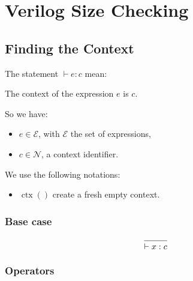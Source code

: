 \documentclass{article}
\DeclareMathOperator{\ctx}{ctx}
\begin{document}
\section*{Verilog Size Checking}

\subsection*{Finding the Context}

The statement $\vdash e: c$ mean:
\begin{center}
  The context of the expression $e$ is $c$.
\end{center}

So we have:
\begin{itemize}
  \item $e \in \mathcal{E}$, with $\mathcal{E}$ the set of expressions,
  \item $c \in \mathcal{N}$, a context identifier.
\end{itemize}

We use the following notations:
\begin{itemize}
  \item $\ctx()$ create a fresh empty context.
\end{itemize}


\subsubsection*{Base case}

\begin{equation*}
  \begin{prooftree}
    \infer0{\vdash x: c}
  \end{prooftree}
\end{equation*}

\subsubsection*{Operators}
\end{document}
